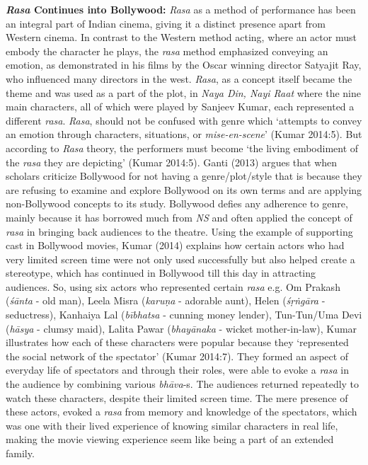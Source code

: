 \textbf{\textsl{Rasa} Continues into Bollywood:} \textsl{Rasa} as a method of performance has been an integral part of Indian cinema, giving it a distinct presence apart from Western cinema. In contrast to the Western method acting, where an actor must embody the character he plays, the \textsl{rasa} method emphasized conveying an emotion, as demonstrated in his films by the Oscar winning director Satyajit Ray, who influenced many directors in the west. \textsl{Rasa}, as a concept itself became the theme and was used as a part of the plot, in \textsl{Naya Din, Nayi Raat} where the nine main characters, all of which were played by Sanjeev Kumar, each represented a different \textsl{rasa}. \textsl{Rasa}, should not be confused with genre which ‘attempts to convey an emotion through characters, situations, or \textsl{mise-en-scene}’ (Kumar 2014:5). But according to \textsl{Rasa} theory, the performers must become ‘the living embodiment of the \textsl{rasa} they are depicting’ (Kumar 2014:5). Ganti (2013) argues that when scholars criticize Bollywood for not having a genre/plot/style that is because they are refusing to examine and explore Bollywood on its own terms and are applying non-Bollywood concepts to its study. Bollywood defies any adherence to genre, mainly because it has borrowed much from \textsl{NS} and often applied the concept of \textsl{rasa} in bringing back audiences to the theatre. Using the example of supporting cast in Bollywood movies, Kumar (2014) explains how certain actors who had very limited screen time were not only used successfully but also helped create a stereotype, which has continued in Bollywood till this day in attracting audiences. So, using six actors who represented certain \textsl{rasa} e.g. Om Prakash (\textsl{śānta} - old man), Leela Misra (\textsl{karuṇa} - adorable aunt), Helen (\textsl{śṛṅgāra} - seductress), Kanhaiya Lal (\textsl{bībhatsa} - cunning money lender), Tun-Tun/Uma Devi (\textsl{hāsya} - clumsy maid), Lalita Pawar (\textsl{bhayānaka} - wicket mother-in-law), Kumar illustrates how each of these characters were popular because they ‘represented the social network of the spectator’ (Kumar 2014:7). They formed an aspect of everyday life of spectators and through their roles, were able to evoke a \textsl{rasa} in the audience by combining various \textsl{bhāva}-s. The audiences returned repeatedly to watch these characters, despite their limited screen time. The mere presence of these actors, evoked a \textsl{rasa} from memory and knowledge of the spectators, which was one with their lived experience of knowing similar characters in real life, making the movie viewing experience seem like being a part of an extended family. 

